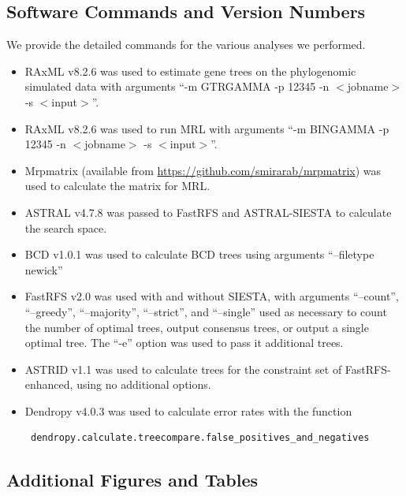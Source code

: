 
\subsection{Software Commands and Version Numbers}
We provide the detailed commands for the various analyses we performed.
\begin{itemize}
\item

RAxML v8.2.6 was used to estimate gene trees on the phylogenomic simulated data with arguments ``-m GTRGAMMA -p 12345 -n  $<$jobname$>$  -s  $<$input$>$''.
\item
RAxML v8.2.6 was used to run MRL with arguments ``-m BINGAMMA -p 12345 -n $<$jobname$>$ -s $<$input$>$''.
\item Mrpmatrix (available from \url{https://github.com/smirarab/mrpmatrix}) was used to calculate the matrix for MRL.
\item
ASTRAL v4.7.8 was passed to FastRFS and ASTRAL-SIESTA to calculate the search space.
\item
BCD v1.0.1 was used to calculate BCD trees using arguments ``--filetype newick''
\item
FastRFS v2.0 was used with and without SIESTA, with arguments
``--count'', ``--greedy'', ``--majority'', ``--strict'', and
``--single'' used as necessary to count the number of optimal trees,
output consensus trees, or output a single optimal tree. The ``-e''
option was used to pass it additional trees. 
\item
ASTRID v1.1 was used to calculate trees for  the constraint set of FastRFS-enhanced, using no additional options.
\item

Dendropy v4.0.3 was used to calculate error rates with the function

\begin{verbatim} dendropy.calculate.treecompare.false_positives_and_negatives\end{verbatim}

\end{itemize}


\clearpage

\subsection{Additional Figures and Tables}



